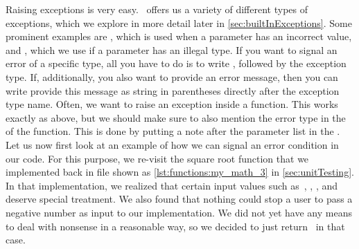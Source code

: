 %
%
%
\endhsection%
%
%
%
Raising exceptions is very easy.
\python\ offers us a variety of different types of exceptions, which we explore in more detail later in \cref{sec:builtInExceptions}.
Some prominent examples are , which is used when a parameter has an incorrect value, and , which we use if a parameter has an illegal type.
If you want to signal an error of a specific type, all you have to do is to write , followed by the exception type.
If, additionally, you also want to provide an error message, then you can write provide this message as string in parentheses directly after the exception type name.%
%
%
%
Often, we want to raise an exception inside a function.
This works exactly as above, but we should make sure to also mention the error type in the  of the function.
This is done by putting a  note after the parameter list in the .%
%
%
%
%
%
\FloatBarrier%
%
%
%
%
%
%
Let us now first look at an example of how we can signal an error condition in our code.
For this purpose, we re-visit the square root function that  we implemented back in file  shown as \cref{lst:functions:my_math_3} in \cref{sec:unitTesting}.
In that implementation, we realized that certain input values such as~, , , and~ deserve special treatment.
We also found that nothing could stop a user to pass a negative number as input to our  implementation.
We did not yet have any means to deal with nonsense in a reasonable way, so we decided to just return~ in that case.

